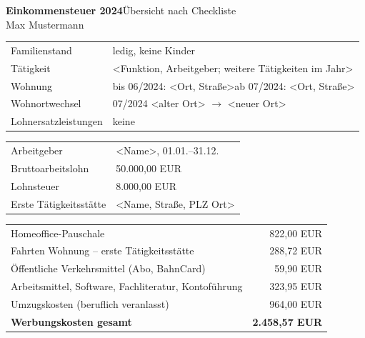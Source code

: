 \documentclass[10pt,a4paper]{article}
\renewcommand{\section}[1]{\par\vspace{11pt}{\large\bfseries #1}\par\nopagebreak\vspace{3pt}\nopagebreak}
\renewcommand{\subsection}[1]{\par\vspace{7pt}{\bfseries #1}\par\nopagebreak\vspace{2pt}\nopagebreak}
\newcommand{\jahr}{2024}
\newcommand{\name}{Max Mustermann}
\begin{document}
{\LARGE\bfseries Einkommensteuer \jahr}\hfill{\color{gray}Übersicht nach Checkliste}\\[1mm]
{\large \name}

\section{1 Allgemeine Angaben}
\begin{tabularx}{\textwidth}{@{}lX@{}}\toprule
Familienstand & ledig, keine Kinder \\
Tätigkeit & <Funktion, Arbeitgeber; weitere Tätigkeiten im Jahr> \\
Wohnung & bis 06/\jahr: <Ort, Straße>\newline ab 07/\jahr: <Ort, Straße> \\
Wohnortwechsel & 07/\jahr{} <alter Ort> $\to$ <neuer Ort> \\
Lohnersatzleistungen & keine \\
\bottomrule\end{tabularx}

\section{2 Einkünfte aus nichtselbständiger Arbeit}
\subsection{2.1 Einnahmen}
\begin{tabularx}{\textwidth}{@{}lX@{}}\toprule
Arbeitgeber & <Name>, 01.01.--31.12. \\
Bruttoarbeitslohn & 50.000,00 EUR \\
Lohnsteuer & 8.000,00 EUR \\
Erste Tätigkeitsstätte & <Name, Straße, PLZ Ort> \\
\bottomrule\end{tabularx}

\subsection{2.2 Werbungskosten: Zusammenfassung}
\begin{tabularx}{\textwidth}{@{}XR@{}}\toprule
Homeoffice-Pauschale & 822,00 EUR \\
Fahrten Wohnung -- erste Tätigkeitsstätte & 288,72 EUR \\
Öffentliche Verkehrsmittel (Abo, BahnCard) & 59,90 EUR \\
Arbeitsmittel, Software, Fachliteratur, Kontoführung & 323,95 EUR \\
Umzugskosten (beruflich veranlasst) & 964,00 EUR \\
\midrule \textbf{Werbungskosten gesamt} & \textbf{2.458,57 EUR} \\
\bottomrule\end{tabularx}
\end{document}
